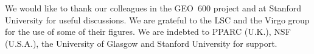 \documentclass{article}
\begin{document}
We would like to thank our colleagues in the GEO~600 project and at Stanford
University for useful discussions. We are grateful to the LSC and the Virgo
group for the use of some of their figures. We are indebted to PPARC (U.K.), NSF
(U.S.A.), the University of Glasgow and Stanford University for support.




\newpage


\end{document}
